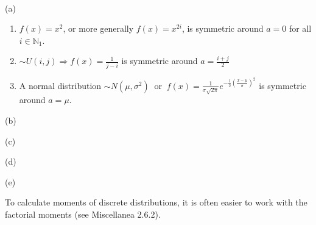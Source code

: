 \documentclass[12pt,letterpaper]{exam}
\begin{document}
\begin{questions}
	\begin{solution}\\
		(a)
		\begin{enumerate}
			\item $f(x) = x^2$, or more generally $f(x) = x^{2i}$, is symmetric around $a=0$ for all $i\in\mathbb{N}_1$.
			\item $\sim U(i,j) \Rightarrow f(x) = \frac{1}{j-i}$ is symmetric around $a=\frac{i+j}{2}$
			\item A normal distribution $\sim N(\mu,\sigma^2)\ $ or $\ f(x) = \frac{1}{\sigma\sqrt{2\pi}}e^{-\frac{1}{2}\left(\frac{x-\mu}{\sigma}\right)^2}$
			is symmetric around $a=\mu$.
		\end{enumerate}
		
		(b)
		
		
		(c)
		
		(d)
		
		(e)
		
		
	\end{solution}

	\setcounter{question}{28}
	\question To calculate moments of discrete distributions, it is often easier to work with the factorial moments (see Miscellanea 2.6.2). 
\end{questions}
\end{document}
